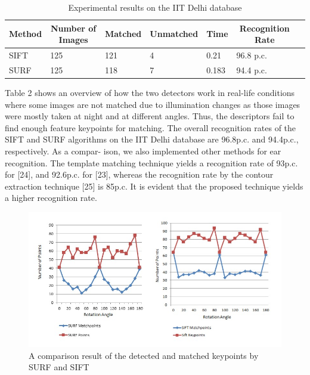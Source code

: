 \begin{table}[]
\centering
\caption{Experimental results on the IIT Delhi database}
\label{table2}
\begin{tabular}{lllllll}
\hline
\multicolumn{1}{c}{Method} &           
\multicolumn{1}{c}{Number of Images} &          
\multicolumn{1}{c}{Matched } &     
\multicolumn{1}{c}{Unmatched } &     
\multicolumn{1}{c}{Time} &     
\multicolumn{1}{c}{Recognition Rate} &     \\ \cline{1-2}
\hline
SIFT  & 125  & 121  & 4 & 0.21 & 96.8 p.c.  \\
\hline
SURF & 125  & 118  & 7 & 0.183 & 94.4 p.c.    \\
 \hline

\end{tabular}
\end{table}

Table 2 shows an overview of how the two detectors work in real-life conditions where some images are not matched due to illumination changes as those images were mostly taken at night and at different angles. Thus, the descriptors fail to find enough feature keypoints for matching. The overall recognition rates of the SIFT and SURF algorithms on the IIT Delhi database are 96.8p.c. and 94.4p.c., respectively. As a compar- ison, we also implemented other methods for ear recognition. The template matching technique yields a recognition rate of 93p.c. for [24], and 92.6p.c. for [23], whereas the recognition rate by the contour extraction technique [25] is 85p.c. It is evident that the proposed technique yields a higher recognition rate.

\begin{figure}
		\includegraphics[width=\textwidth]{Figures/Figure17}
	\caption{A comparison result of the detected and matched keypoints by SURF and SIFT}
	\label{fig:Figure13}
\end{figure}

